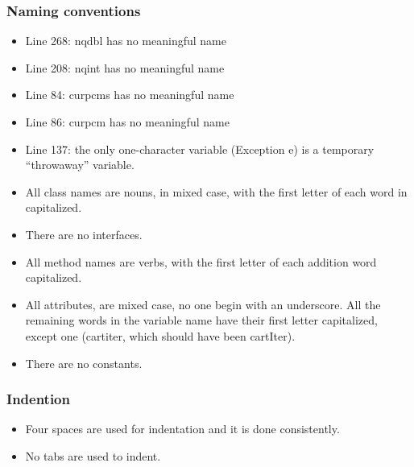 \subsubsection{Naming conventions}
\begin{itemize}

\item Line 268: nqdbl has no meaningful name
\item Line 208: nqint has no meaningful name
\item Line 84: curpcms has no meaningful name
\item Line 86: curpcm has no meaningful name

\item Line 137: the only one-character variable (Exception e) is a temporary
“throwaway” variable.\\

\item All class names are nouns, in mixed case, with the first letter of each word
in capitalized.\\

\item There are no interfaces.\\

\item All method names are verbs, with the first letter of each addition
word capitalized.\\

\item All attributes, are mixed case, no one begin
with an underscore. All the
remaining words in the variable name have their first letter capitalized, except one (cartiter, which should have been cartIter).
 \\
 
 \item There are no constants.\\
\end{itemize}

\subsubsection{Indention}
\begin{itemize}
\item Four spaces are used for indentation and it is done consistently. \\
\item No tabs are used to indent.\\
\end{itemize}


